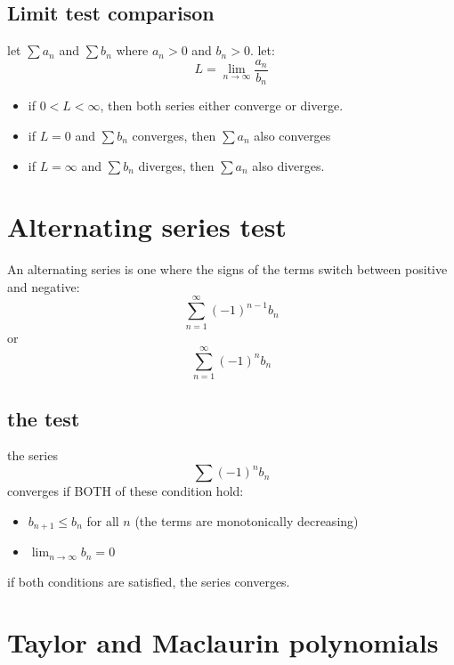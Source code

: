\documentclass{article}
\begin{document}
                        \subsection{Limit test comparison}
                            let \(\sum a_n \) and \(\sum b_n\)  where \(a_n > 0\) and \(b_n > 0\). 
                            let: 
                                \[L = \lim_{n \to \infty} \frac{a_n}{b_n}\]
                                \begin{itemize}
                                    \item if \(0 < L < \infty\), then both series either converge or diverge. 
                                    \item if \(L = 0\) and \(\sum b_n\) converges, then \(\sum a_n\) also converges
                                    \item if \(L = \infty\) and \(\sum b_n\) diverges, then \(\sum a_n\) also diverges.
                                \end{itemize}
                    \section{Alternating series test}
                                An alternating series is one where the signs of the terms switch between positive and negative: 
                                    \[\sum_{n = 1}^{\infty} {(-1)}^{n-1} b_n\]
                                    or 
                                    \[\sum_{n = 1}^{\infty} {(-1)}^{n} b_n\]
                                \subsection{the test} 
                                    the series 
                                    \[\sum {(-1)}^{n} b_n\]
                                    converges if BOTH of these condition hold: 
                                    \begin{itemize}
                                        \item \(b_{n+1} \leq b_n \) for all \(n\) (the terms are monotonically decreasing)
                                        \item \(\lim_{n \to \infty} b_n = 0\)
                                    \end{itemize}
                                    if both conditions are satisfied, the series converges.
                    \section{Taylor and Maclaurin polynomials}
\end{document}
